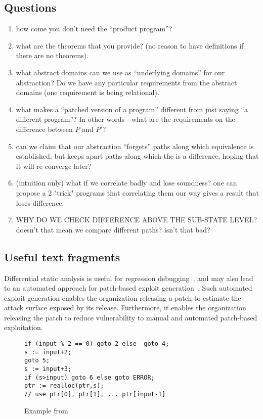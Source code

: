 \subsection{Questions}

\begin{enumerate}
\item how come you don't need the ``product program''?
\item what are the theorems that you provide? (no reason to have definitions if there are no theorems).
\item what abstract domains can we use as ``underlying domains'' for our abstraction? Do we have any particular requirements from the abstract domains (one requirement is being relational).
\item what makes a ``patched version of a program'' different from just saying ``a different program''? In other words - what are the requirements on the difference between $P$ and $P'$?
\item can we claim that our abstraction ``forgets'' paths along which equivalence is established, but keeps apart paths along which the is a difference, hoping that it will re-converge later?
\item (intuition only) what if we correlate badly and lose soundness? one can propose a 2 "trick" programs that correlating them our way gives a result that loses difference.
\item WHY DO WE CHECK DIFFERENCE ABOVE THE SUB-STATE LEVEL? doesn't that mean we compare different paths? isn't that bad?
\end{enumerate}

\subsection{Useful text fragments}

Differential static analysis is useful for regression debugging~\cite{TODO}, and may also lead to an automated approach for patch-based exploit generation~\cite{TODO}. Such automated exploit generation enables the organization releasing a patch to estimate the attack surface exposed by its release. Furthermore, it enables the organization releasing the patch to reduce vulnerability to manual and automated patch-based exploitation.


\begin{figure}
\begin{lstlisting}
if (input % 2 == 0) goto 2 else  goto 4;
s := input+2;
goto 5;
s := input+3;
if (s>input) goto 6 else goto ERROR;
ptr := realloc(ptr,s);
// use ptr[0], ptr[1], ... ptr[input-1]
\end{lstlisting}
\caption{Example from \cite{TODO}}
\end{figure} 